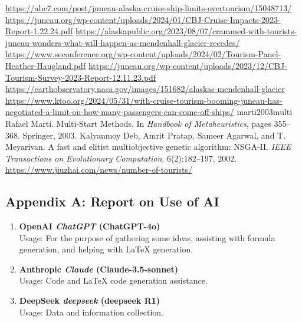 \documentclass[12pt]{article}  %
\begin{document}
\clearpage


\begin{thebibliography}{99}
 \url{https://abc7.com/post/juneau-alaska-cruise-ship-limits-overtourism/15048713/}
 \url{https://juneau.org/wp-content/uploads/2024/01/CBJ-Cruise-Impacts-2023-Report-1.22.24.pdf}
 \url{https://alaskapublic.org/2023/08/07/crammed-with-tourists-juneau-wonders-what-will-happen-as-mendenhall-glacier-recedes/}
 \url{https://www.seconference.org/wp-content/uploads/2024/02/Tourism-Panel-Heather-Haugland.pdf}
 \url{https://juneau.org/wp-content/uploads/2023/12/CBJ-Tourism-Survey-2023-Report-12.11.23.pdf}
 \url{https://earthobservatory.nasa.gov/images/151682/alaskas-mendenhall-glacier}
 \url{https://www.ktoo.org/2024/05/31/with-cruise-tourism-booming-juneau-has-negotiated-a-limit-on-how-many-passengers-can-come-off-ships/}
 {marti2003multi} Rafael Martí. \newblock Multi-Start Methods. \newblock In \emph{Handbook of Metaheuristics}, pages 355--368. Springer, 2003.
 Kalyanmoy Deb, Amrit Pratap, Sameer Agarwal, and T. Meyarivan. \newblock A fast and elitist multiobjective genetic algorithm: NSGA-II. \newblock \emph{IEEE Transactions on Evolutionary Computation}, 6(2):182--197, 2002.
 \url{https://www.jiuzhai.com/news/number-of-tourists/}
\end{thebibliography}


\begin{subappendices}  %

\section{Appendix A: Report on Use of AI}
\begin{enumerate}
	\item \textbf{OpenAI \textit{ChatGPT} (ChatGPT-4o)}\\
	Usage: For the purpose of gathering some ideas, assisting with formula generation, and helping with LaTeX generation.
	
	\item \textbf{Anthropic \textit{Claude} (Claude-3.5-sonnet)}\\
	Usage: Code and LaTeX code generation assistance.
	
	\item \textbf{DeepSeek \textit{deepseek} (deepseek R1)}\\
	Usage: Data and information collection.
\end{enumerate}
\end{subappendices}  %
\end{document}
